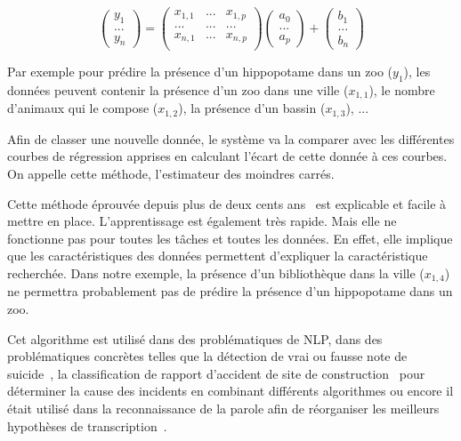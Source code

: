 \begin{equation}
  \begin{pmatrix} y_1\\ ...\\ y_n \end{pmatrix}
=
\begin{pmatrix} x_{1,1}& ...  & x_{1,p}  \\ ...& ... & ... \\ x_{n,1}& ... & x_{n,p}  \\ \end{pmatrix}
\begin{pmatrix} a_0\\ ...\\ a_p\end{pmatrix}
+
\begin{pmatrix} b_1\\ ...\\ b_n \end{pmatrix}
  \label{eq:regression_lineaire}
\end{equation}

Par exemple pour prédire la présence d'un hippopotame dans un zoo ($y_1$), les données peuvent contenir la présence d'un zoo dans une ville ($x_{1,1}$), le nombre d'animaux qui le compose ($x_{1,2}$), la présence d'un bassin ($x_{1,3}$), ...

Afin de classer une nouvelle donnée, le système va la comparer avec les différentes courbes de régression apprises en calculant l'écart de cette donnée à ces courbes. On appelle cette méthode, l'estimateur des moindres carrés.

Cette méthode éprouvée depuis plus de deux cents ans~\cite{Gauss1809,Legendre1805,Adrain1808} est explicable et facile à mettre en place.  L'apprentissage est également très rapide. Mais elle ne fonctionne pas pour toutes les tâches et toutes les données. En effet, elle implique que les caractéristiques des données permettent d'expliquer la caractéristique recherchée. Dans notre exemple, la présence d'un bibliothèque dans la ville ($x_{1,4}$) ne permettra probablement pas de prédire la présence d'un hippopotame dans un zoo.

Cet algorithme est utilisé dans des problématiques de NLP, dans des problématiques concrètes telles que la détection de vrai ou fausse note de suicide~\cite{Pestian2010}, la classification de rapport d'accident de site de construction~\cite{Zhang2019} pour déterminer la cause des incidents en combinant différents algorithmes ou encore il était utilisé dans la reconnaissance de la parole afin de réorganiser les meilleurs hypothèses de transcription~\cite{Chotimongkol2001}.

